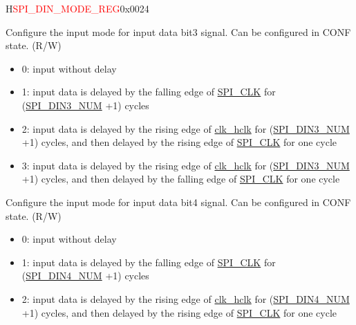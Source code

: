 \addtocounter{Regfloat}{-1}
\begin{register}{H}{\textcolor{red}{SPI\_DIN\_MODE\_REG}}{0x{}0024}
\begin{regdesc}\begin{reglist}
\item [Continued from the previous page...]

\label{fielddesc:SPIDIN3MODE}\item [SPI\_DIN3\_MODE] Configure the input mode for input data bit3 signal. Can be configured in CONF state. (R/W)

\begin{itemize}
    \item 0: input without delay
    \item 1: input data is delayed by the falling edge of \hyperref[clk:SPICLK]{SPI\_CLK} for (\hyperref[fielddesc:SPIDIN3NUM]{SPI\_DIN3\_NUM} +1) cycles

    \item 2: input data is delayed by the rising edge of \hyperref[clk:clkhclk]{clk\_hclk} for (\hyperref[fielddesc:SPIDIN3NUM]{SPI\_DIN3\_NUM} +1) cycles, and then delayed by the rising edge of \hyperref[clk:SPICLK]{SPI\_CLK} for one cycle

    \item 3: input data is delayed by the rising edge of \hyperref[clk:clkhclk]{clk\_hclk} for (\hyperref[fielddesc:SPIDIN3NUM]{SPI\_DIN3\_NUM} +1) cycles, and then delayed by the falling edge of \hyperref[clk:SPICLK]{SPI\_CLK} for one cycle
\end{itemize}

\label{fielddesc:SPIDIN4MODE}\item [\textcolor{red}{SPI\_DIN4\_MODE (for SPI2 only)}] Configure the input mode for input data bit4 signal. Can be configured in CONF state. (R/W)

\begin{itemize}
    \item 0: input without delay
    \item 1: input data is delayed by the falling edge of \hyperref[clk:SPICLK]{SPI\_CLK} for (\hyperref[fielddesc:SPIDIN4NUM]{SPI\_DIN4\_NUM} +1) cycles

    \item 2: input data is delayed by the rising edge of \hyperref[clk:clkhclk]{clk\_hclk} for (\hyperref[fielddesc:SPIDIN4NUM]{SPI\_DIN4\_NUM} +1) cycles, and then delayed by the rising edge of \hyperref[clk:SPICLK]{SPI\_CLK} for one cycle


\end{itemize}
\end{reglist}
\end{regdesc}
\end{register}
